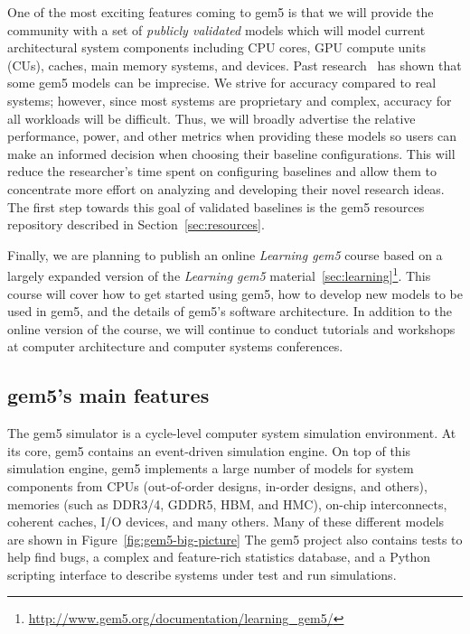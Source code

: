 One of the most exciting features coming to gem5 is that we will provide the community with a set of \emph{publicly validated} models which will model current architectural system components including CPU cores, GPU compute units (CUs), caches, main memory systems, and devices.
Past research~\cite{butko2012accuracy, nowatzki2015architectural, endo2014micro, akram201686, asri2016simulator, akram2019validation, gutierrez2014sources, jo2018diagsim, tanimoto2017dependence, walker2018hardware} has shown that some gem5 models can be imprecise.
We strive for accuracy compared to real systems; however, since most systems are proprietary and complex, accuracy for all workloads will be difficult.
Thus, we will broadly advertise the relative performance, power, and other metrics when providing these models so users can make an informed decision when choosing their baseline configurations.
This will reduce the researcher's time spent on configuring baselines and allow them to concentrate more effort on analyzing and developing their novel research ideas.
The first step towards this goal of validated baselines is the gem5 resources repository described in Section~\ref{sec:resources}.

Finally, we are planning to publish an online \emph{Learning gem5} course based on a largely expanded version of the \emph{Learning gem5} material~\ref{sec:learning}\footnote{\url{http://www.gem5.org/documentation/learning_gem5/}}.
This course will cover how to get started using gem5, how to develop new models to be used in gem5, and the details of gem5's software architecture.
In addition to the online version of the course, we will continue to conduct tutorials and workshops at computer architecture and computer systems conferences.

\subsection{gem5's main features}
\label{sec:main-features}

The gem5 simulator is a cycle-level computer system simulation environment.
At its core, gem5 contains an event-driven simulation engine.
On top of this simulation engine, gem5 implements a large number of models for system components from CPUs (out-of-order designs, in-order designs, and others), memories (such as DDR3/4, GDDR5, HBM, and HMC), on-chip interconnects, coherent caches, I/O devices, and many others.
Many of these different models are shown in Figure~\ref{fig:gem5-big-picture}
The gem5 project also contains tests to help find bugs, a complex and feature-rich statistics database, and a Python scripting interface to describe systems under test and run simulations.

